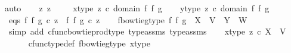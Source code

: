 \begin{isabellebody}
{\isacharparenleft}{\kern0pt}auto{\isacharparenright}{\kern0pt}\isanewline
\ \ \isamarkupfalse%
\ z{}\ z{}\ \isanewline
\ \ \isamarkupfalse%
\ x{\isacharunderscore}{\kern0pt}type{\isacharcolon}{\kern0pt}\ {\isachardoublequoteopen}z{}\ {\isasymin}\isactrlsub c\ domain\ {\isacharparenleft}{\kern0pt}f\ {\isasymbowtie}\isactrlsub f\ g{\isacharparenright}{\kern0pt}{\isachardoublequoteclose}\isanewline
\ \ \isamarkupfalse%
\ y{\isacharunderscore}{\kern0pt}type{\isacharcolon}{\kern0pt}\ {\isachardoublequoteopen}z{}\ {\isasymin}\isactrlsub c\ domain\ {\isacharparenleft}{\kern0pt}f\ {\isasymbowtie}\isactrlsub f\ g{\isacharparenright}{\kern0pt}{\isachardoublequoteclose}\isanewline
\ \ \isamarkupfalse%
\ eqs{\isacharcolon}{\kern0pt}\ {\isachardoublequoteopen}{\isacharparenleft}{\kern0pt}f\ {\isasymbowtie}\isactrlsub f\ g{\isacharparenright}{\kern0pt}\ {\isasymcirc}\isactrlsub c\ z{}\ {\isacharequal}{\kern0pt}\ {\isacharparenleft}{\kern0pt}f\ {\isasymbowtie}\isactrlsub f\ g{\isacharparenright}{\kern0pt}\ {\isasymcirc}\isactrlsub c\ z{}{\isachardoublequoteclose}\isanewline
\isanewline
\ \ \isamarkupfalse%
\ f{\isacharunderscore}{\kern0pt}bowtie{\isacharunderscore}{\kern0pt}g{\isacharunderscore}{\kern0pt}type{\isacharcolon}{\kern0pt}\ {\isachardoublequoteopen}{\isacharparenleft}{\kern0pt}f\ {\isasymbowtie}\isactrlsub f\ g{\isacharparenright}{\kern0pt}\ {\isacharcolon}{\kern0pt}\ X\ {\isasymCoprod}\ V\ {\isasymrightarrow}\ Y\ {\isasymCoprod}\ W{\isachardoublequoteclose}\isanewline
\ \ \ \ \isamarkupfalse%
\ {\isacharparenleft}{\kern0pt}simp\ add{\isacharcolon}{\kern0pt}\ cfunc{\isacharunderscore}{\kern0pt}bowtie{\isacharunderscore}{\kern0pt}prod{\isacharunderscore}{\kern0pt}type\ type{\isacharunderscore}{\kern0pt}assms{\isacharparenleft}{\kern0pt}{}{\isacharparenright}{\kern0pt}\ type{\isacharunderscore}{\kern0pt}assms{\isacharparenleft}{\kern0pt}{}{\isacharparenright}{\kern0pt}{\isacharparenright}{\kern0pt}\isanewline
\isanewline
\ \ \isamarkupfalse%
\ x{\isacharunderscore}{\kern0pt}type{}{\isacharcolon}{\kern0pt}\ {\isachardoublequoteopen}z{}\ {\isasymin}\isactrlsub c\ X\ {\isasymCoprod}\ V{\isachardoublequoteclose}\isanewline
\ \ \ \ \isamarkupfalse%
\ cfunc{\isacharunderscore}{\kern0pt}type{\isacharunderscore}{\kern0pt}def\ f{\isacharunderscore}{\kern0pt}bowtie{\isacharunderscore}{\kern0pt}g{\isacharunderscore}{\kern0pt}type\ x{\isacharunderscore}{\kern0pt}type\ \isamarkupfalse%

\end{isabellebody}
